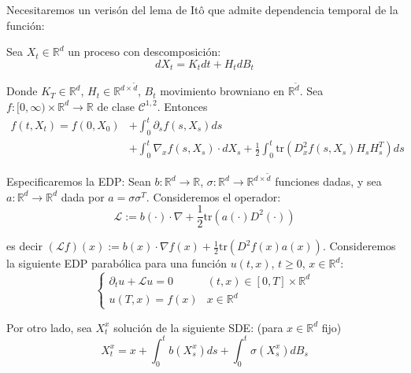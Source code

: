 Necesitaremos un verisón del lema de It\^{o} que admite dependencia temporal de la función:
\begin{theorem}[Lema de It\^{o}]
        Sea $X_t \in \mathbb{R}^{d}$  un proceso con descomposición: 
        \begin{equation*}
                dX_t = K_t dt + H_t dB_t 
        \end{equation*}

        Donde $K_T \in \mathbb{R}^{d}$, $H_t \in \mathbb{R}^{d \times \tilde{d}}$, $B_t$ movimiento browniano en 
        $\mathbb{R}^{\tilde{d}}$. Sea $f : [0, \infty) \times  \mathbb{R}^{d} \to \mathbb{R}$ de clase $\mathcal{C}^{1,2}$. 
        Entonces
        \begin{align*}
                f(t,X_t) 
                 = f(0,X_0) &+ \int_{0}^{t} \partial_s f(s,X_s) ds \\ 
                & + \int_{0}^{t} \nabla_{x} f(s, X_s) \cdot dX_s 
                    + \frac{1}{2} \int_{0}^{t} \text{tr}( D^2_x f(s,X_s)H_s H_s^T) ds
        \end{align*}
\end{theorem}

Especificaremos la EDP: Sean $b: \mathbb{R}^{d} \to \mathbb{R}$, $\sigma : \mathbb{R}^{d} \to  \mathbb{R}^{d \times \tilde{d}}$
funciones dadas, y sea $a: \mathbb{R}^{d} \to \mathbb{R}^{d}$ dada por $a = \sigma \sigma^T$. Consideremos el 
operador:
\begin{equation*}
        \mathcal{L} := b(\cdot) \cdot \nabla + \frac{1}{2} \text{tr}(a(\cdot) D^2 (\cdot ))
\end{equation*}

es decir $(\mathcal{L} f)(x) := b(x) \cdot \nabla f(x) + \frac{1}{2} \text{tr}(D^2 f(x) a(x))$. 
Consideremos la siguiente EDP parabólica para una función $u(t,x)$, $t \ge 0$, $x \in \mathbb{R}^{d}$: 
\begin{equation*}
        \label{eq:sde_11} 
        \tag{*} 
        \begin{cases}
                \partial_t u + \mathcal{L} u = 0 & (t,x) \in [0,T] \times \mathbb{R}^{d} \\ 
                u(T,x) = f(x) & x \in \mathbb{R}^{d}
        \end{cases}
\end{equation*}

Por otro lado, sea $X_t^{x}$ solución de la siguiente SDE: (para $x \in \mathbb{R}^d$ fijo)
\begin{equation*}
        \label{eq:sde_12}
        \tag{**}
        X_t^x = x + \int_{0}^{t} b(X_s^x) ds + \int_{0}^{t} \sigma (X_s^x) dB_s
\end{equation*}

